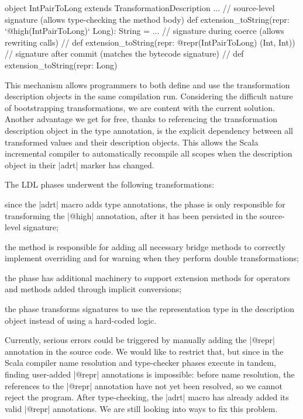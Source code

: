 \begin{lstlisting-nobreak}
object IntPairToLong extends TransformationDescription {
  ...
  // source-level signature (allows type-checking the method body)
  def extension_toString(repr: `@high(IntPairToLong)` Long): String = ...
  // signature during coerce (allows rewriting calls)
  //   def extension_toString(repr: @repr(IntPairToLong) (Int, Int))
  // signature after commit (matches the bytecode signature)
  //   def extension_toString(repr: Long)
}
\end{lstlisting-nobreak}

This mechanism allows programmers to both define and use the transformation description objects in the same compilation run. Considering the difficult nature of bootstrapping transformations, we are  content with the current solution.
Another advantage we get for free, thanks to referencing the transformation description object in the type annotation, is the explicit dependency between all transformed values and their description objects. This allows the Scala incremental compiler to automatically recompile all scopes when the description object in their |adrt| marker has changed.

The LDL phases underwent the following transformations:
\begin{compactitem}
\item since the |adrt| macro adds type annotations, the \inject{} phase is only responsible for transforming the |@high| annotation, after it has been persisted in the source-level signature;
\item the \bridge{} method is responsible for adding all necessary bridge methods to correctly implement overriding and for warning when they perform double transformations;
\item the \coerce{} phase has additional machinery to support extension methods for operators and methods added through implicit conversions;
\item the \commit{} phase transforms signatures to use the representation type in the description object instead of using a hard-coded logic.
\end{compactitem}

Currently, serious errors could be triggered by manually adding the |@repr| annotation in the source code. We would like to restrict that, but since in the Scala compiler name resolution and type-checker phases execute in tandem, finding user-added |@repr| annotations is impossible: before name resolution, the references to the |@repr| annotation have not yet been resolved, so we cannot reject the program. After type-checking, the |adrt| macro has already added its valid |@repr| annotations. We are still looking into  ways to fix this problem.
